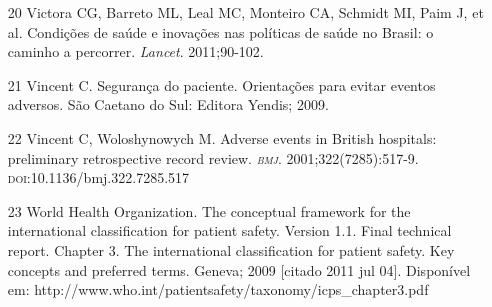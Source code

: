 \documentclass{article}
\begin{document}
\begin{itemize}
\item[20] Victora CG, Barreto ML, Leal MC, Monteiro CA, Schmidt MI, Paim J, et
al.
Condições de saúde e inovações nas políticas de saúde no Brasil: o caminho a
percorrer.
\textit{Lancet}. 2011;90-102.

\item[21] Vincent C. Segurança do paciente. Orientações para evitar eventos
adversos. São Caetano do Sul: Editora Yendis; 2009.

\item[22] Vincent C, Woloshynowych M. Adverse events in British hospitals:
preliminary retrospective record review. \textit{\textsc{bmj}}. 2001;322(7285):517-9.
\textsc{doi}:10.1136/bmj.322.7285.517

\item[23] World Health Organization. The conceptual framework for the
international
classification for patient safety. Version 1.1. Final technical report. Chapter
3. The
international classification for patient safety. Key concepts and preferred
terms. Geneva;
2009 [citado 2011 jul 04]. Disponível em:
http://www.who.int/patientsafety/taxonomy/icps\_{}chapter3.pdf

\end{itemize}


\end{document}

